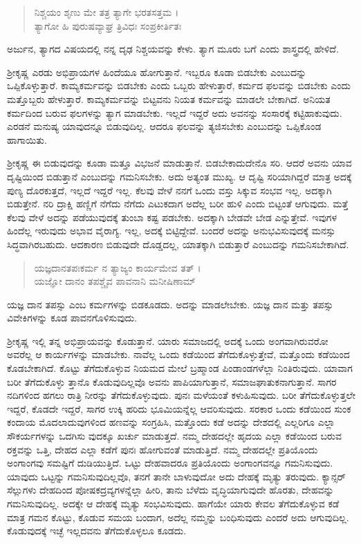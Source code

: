 \begin{verse}
ನಿಶ್ಚಯಂ ಶೃಣು ಮೇ ತತ್ರ ತ್ಯಾಗೇ ಭರತಸತ್ತಮ ।\\ತ್ಯಾಗೋ ಹಿ ಪುರುಷವ್ಯಾಘ್ರ ತ್ರಿವಿಧಃ ಸಂಪ್ರಕೀರ್ತಿತಃ 
\end{verse}

{\small ಅರ್ಜುನ, ತ್ಯಾಗದ ವಿಷಯದಲ್ಲಿ ನನ್ನ ದೃಢ ನಿಶ್ಚಯವನ್ನು ಕೇಳು. ತ್ಯಾಗ ಮೂರು ಬಗೆ ಎಂದು ಶಾಸ್ತ್ರದಲ್ಲಿ ಹೇಳಿದೆ.}

ಶ್ರೀಕೃಷ್ಣ ಎರಡು ಅಭಿಪ್ರಾಯಗಳ ಹಿಂದೆಯೂ ಹೋಗುತ್ತಾನೆ. ಇಬ್ಬರೂ ಕೂಡಾ ಬಿಡಬೇಕು ಎಂಬುದನ್ನು ಒಪ್ಪಿಕೊಳ್ಳುತ್ತಾರೆ. ಕಾಮ್ಯಕರ್ಮವನ್ನು ಬಿಡಬೇಕು ಎಂದು ಒಬ್ಬರು ಹೇಳುತ್ತಾರೆ, ಕರ್ಮದ ಫಲವನ್ನು ಬಿಡಬೇಕು ಎಂದು ಮತ್ತೊಬ್ಬರು ಹೇಳುತ್ತಾರೆ. ಕಾಮ್ಯಕರ್ಮವನ್ನು ಬಿಟ್ಟವನು ನಿಯತ ಕರ್ಮವನ್ನು ಮಾಡಲೇ ಬೇಕಾಗಿದೆ. ಅನಿಯತ ಕರ್ಮದಿಂದ ಬರುವ ಫಲಗಳನ್ನು ತ್ಯಾಗ ಮಾಡಬೇಕು. ಇಲ್ಲದೆ ಇದ್ದರೆ ಅದು ಅವನನ್ನು ಸಂಸಾರಕ್ಕೆ ಕಟ್ಟಿಹಾಕುವುದು. ಎರಡನೆ ಮನುಷ್ಯ ಯಾವುದನ್ನೂ ಬಿಡುವುದಿಲ್ಲ. ಆದರೂ ಫಲವನ್ನು ತ್ಯಜಿಸಬೇಕು ಎಂಬುದನ್ನು ಒಪ್ಪಿಕೊಂಡ ಹಾಗಾಯಿತು.

ಶ್ರೀಕೃಷ್ಣ ಈ ಬಿಡುವುದನ್ನು ಕೂಡಾ ಮತ್ತೂ ವಿಭಜನೆ ಮಾಡುತ್ತಾನೆ. ಬಿಡಬೇಕಾದುದೇನೊ ಸರಿ. ಆದರೆ ಅವನು ಯಾವ ದೃಷ್ಟಿಯಿಂದ ಬಿಡುತ್ತಾನೆ ಎಂಬುದನ್ನು ಗಮನಿಸಬೇಕು. ಅದು ಅತ್ಯಂತ ಮುಖ್ಯ. ಆ ದೃಷ್ಟಿ ಸರಿಯಾಗಿದ್ದರೆ ಮಾತ್ರ ಅದಕ್ಕೆ ಪುಣ್ಯ ದೊರಕುತ್ತದೆ, ಇಲ್ಲದೆ ಇದ್ದರೆ ಇಲ್ಲ. ಕೆಲವು ವೇಳೆ ನನಗೆ ಒಂದು ವಸ್ತು ಸಿಕ್ಕುವ ಸಂಭವ ಇಲ್ಲ. ಅದಕ್ಕಾಗಿ ಬಿಡುತ್ತೇನೆ. ನರಿ ದ್ರಾಕ್ಷಿ ಹಣ್ಣಿಗೆ ನೆಗೆದು ನೆಗೆದು ಎಟುಕದಾಗ ಅದೆಲ್ಲ ಬರೀ ಹುಳಿ ಎಂದು ಬಿಟ್ಟಂತೆ ಆಗುವುದು. ಮತ್ತೆ ಕೆಲವು ವೇಳೆ ಅದನ್ನು ಪಡೆಯುವುದಕ್ಕೆ ತುಂಬಾ ಕಷ್ಟ ಪಡಬೇಕು. ಅದಕ್ಕಾಗಿ ಬೇಡವೇ ಬೇಡ ಎನ್ನುತ್ತೇವೆ. ಇವುಗಳ ಹಿಂದೆಲ್ಲ ಇರುವುದು ಅಭಾವ ವೈರಾಗ್ಯ. ಇಲ್ಲ, ಅದಕ್ಕೆ ಬಿಟ್ಟಿದ್ದೇವೆ. ಬಂದರೆ ಅದನ್ನು ಅನುಭವಿಸುವುದಕ್ಕೆ ಮನಸ್ಸು ಸಿದ್ಧವಾಗಿರಬಹುದು. ಆದಕಾರಣ ಬಿಡುವುದೇ ದೊಡ್ಡದಲ್ಲ, ಯಾತಕ್ಕಾಗಿ ಬಿಡುತ್ತಾರೆ ಎಂಬುದನ್ನು ಗಮನಿಸಬೇಕಾಗಿದೆ.

\begin{verse}
ಯಜ್ಞದಾನತಪಃಕರ್ಮ ನ ತ್ಯಾಜ್ಯಂ ಕಾರ್ಯಮೇವ ತತ್ ।\\ಯಜ್ಞೋ ದಾನಂ ತಪಶ್ಚೈವ ಪಾವನಾನಿ ಮನೀಷಿಣಾಮ್ 
\end{verse}

{\small ಯಜ್ಞ ದಾನ ತಪಸ್ಸು ಎಂಬ ಕರ್ಮಗಳನ್ನು ಬಿಡಕೂಡದು. ಅದನ್ನು ಮಾಡಲೇಬೇಕು. ಯಜ್ಞ ದಾನ ಮತ್ತು ತಪಸ್ಸು ವಿವೇಕಿಗಳನ್ನು ಕೂಡ ಪಾವನಗೊಳಿಸುವುದು.}

ಶ್ರೀಕೃಷ್ಣ ಇಲ್ಲಿ ತನ್ನ ಅಭಿಪ್ರಾಯವನ್ನು ಕೊಡುತ್ತಾನೆ. ಯಾರು ಸಮಾಜದಲ್ಲಿ ಅದಕ್ಕೆ ಒಂದು ಅಂಗವಾಗಿರುವರೋ ಅವರೆಲ್ಲ ಆ ಕಾರ್ಯಗಳನ್ನು ಮಾಡಬೇಕು. ನಾವೆಲ್ಲ ಒಂದು ಕಡೆಯಿಂದ ತೆಗೆದುಕೊಳ್ಳುತ್ತೇವೆ, ಮತ್ತೊಂದು ಕಡೆಯಿಂದ ಕೊಡಬೇಕಾಗಿದೆ. ಕೊಟ್ಟು ತೆಗೆದುಕೊಳ್ಳುವ ನಿಯಮದ ಮೇಲೆ ಬ್ರಹ್ಮಾಂಡ ಪಿಂಡಾಂಡಗಳೆಲ್ಲಾ ನಿಂತಿರುವುದು. ಯಾವಾಗ ಬರೀ ತೆಗೆದುಕೊಳ್ಳು ತ್ತಾನೊ ಕೊಡುವುದಿಲ್ಲವೊ ಅವನು ಪಾಪಿಯಾಗುತ್ತಾನೆ, ಸಮಾಜಘಾತುಕನಾಗುತ್ತಾನೆ. ಸಾಗರ ನದಿಗಳಿಂದ ಹಗಲು ರಾತ್ರಿ ನೀರನ್ನು ತೆಗೆದುಕೊಳ್ಳುವುದು. ಪುನಃ ಮಳೆಯಂತೆ ಕಳುಹಿಸುವುದು. ಬರೀ ತೆಗೆದುಕೊಳ್ಳುತ್ತಲೇ ಇದ್ದರೆ, ಕೊಡದೇ ಇದ್ದರೆ, ಸಾಗರ ಉಕ್ಕಿ ಹರಿದು ಭೂಮಿಯನ್ನೆಲ್ಲ ಆವರಿಸುವುದು. ಸರಕಾರ ಒಂದು ಕಡೆಯಿಂದ ಸುಂಕ ಕಂದಾಯ ಮೊದಲಾದುವುಗಳಿಂದ ಹಣವನ್ನು ಸಂಗ್ರಹಿಸಿ, ಮತ್ತೊಂದು ಕಡೆ ಅದನ್ನು ದೇಶದಲ್ಲಿ ಎಲ್ಲರಿಗೂ ಎಲ್ಲಾ ಸೌಕರ್ಯಗಳನ್ನು ಒದಗಿಸು ವುದಕ್ಕೂ ಖರ್ಚು ಮಾಡುತ್ತದೆ. ನಮ್ಮ ದೇಹದಲ್ಲೇ ಹೃದಯ ಎಲ್ಲಾ ಕಡೆಯಿಂದ ಬರುವ ರಕ್ತವನ್ನು ಒತ್ತಿ, ದೇಹದ ಎಲ್ಲಾ ಕಡೆಗೆ ಪುನಃ ಹೋಗುವಂತೆ ಮಾಡುತ್ತಿದೆ. ನಮ್ಮ ದೇಹದಲ್ಲೇ ಪ್ರತಿಯೊಂದು ಅಂಗಾಂಗವು ಸಮಷ್ಟಿಗೆ ದುಡಿಯುತ್ತಿದೆ. ಒಟ್ಟು ದೇಹವಾದರೂ ಪ್ರತಿಯೊಂದು ಅಂಗಾಂಗವನ್ನೂ ಗಮನಿಸುವುದು. ಯಾವುದು ಒಟ್ಟನ್ನು ಗಮನಿಸುವುದಿಲ್ಲವೊ, ತನಗೆ ತಾನೇ ಬಾಳುವುದೋ ಅದು ದೇಹಕ್ಕೆ ಮೃತ್ಯು ತರುವುದು. ಕ್ಯಾನ್ಸರ್ ಸೆಲ್ಲುಗಳು ದೇಹದಿಂದ ಪೋಷಕದ್ರವ್ಯಗಳನ್ನೆಲ್ಲಾ ಹೀರಿ, ತಾನು ಬೆಳೆದು ವೃದ್ಧಿಯಾಗುವುದೇ ಹೊರತು, ದೇಹವನ್ನು ಗಮನಿಸುವುದಿಲ್ಲ. ಅದಕ್ಕೇ ಆ ದೇಹಕ್ಕೆ ಮೃತ್ಯು ಸಂಭವಿಸುವುದು. ಹಾಗೆಯೇ ಯಾರು ಕೇವಲ ತೆಗೆದುಕೊಳ್ಳುವ ಕಡೆ ಮಾತ್ರ ಗಮನ ಕೊಟ್ಟು, ಕೊಡುವ ಸಮಯ ಬಂದಾಗ, ಅದೆಲ್ಲ ನಮ್ಮನ್ನು ಬಂಧಿಸುವುದು ಎಂದರೆ ಅದು ಆಗುವುದಿಲ್ಲ. ಕೊಡುವುದಕ್ಕೆ ಇಚ್ಛೆ ಇಲ್ಲದವನು ತೆಗೆದುಕೊಳ್ಳಲೂ ಕೂಡದು.

